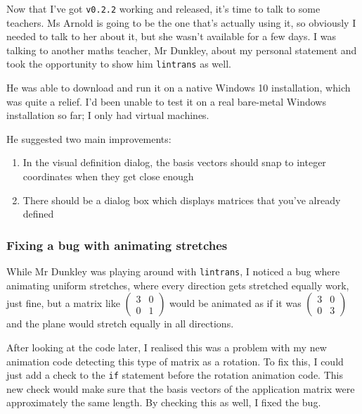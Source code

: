 \documentclass[../development.tex]{subfiles}
\begin{document}
Now that I've got \texttt{v0.2.2} working and released, it's time to talk to some teachers. Ms Arnold is going to be the one that's actually using it, so obviously I needed to talk to her about it, but she wasn't available for a few days. I was talking to another maths teacher, Mr Dunkley, about my personal statement and took the opportunity to show him \texttt{lintrans} as well.

He was able to download and run it on a native Windows 10 installation, which was quite a relief. I'd been unable to test it on a real bare-metal Windows installation so far; I only had virtual machines.

He suggested two main improvements: \begin{enumerate}
	\item In the visual definition dialog, the basis vectors should snap to integer coordinates when they get close enough
	\item There should be a dialog box which displays matrices that you've already defined
\end{enumerate}

\subsubsection{Fixing a bug with animating stretches\label{development:teacher-suggestions:fixing-a-bug-with-animating-stretches}}

While Mr Dunkley was playing around with \texttt{lintrans}, I noticed a bug where animating uniform stretches, where every direction gets stretched equally work, just fine, but a matrix like $\begin{pmatrix}3 & 0\\ 0 & 1\end{pmatrix}$ would be animated as if it was $\begin{pmatrix}3 & 0\\ 0 & 3\end{pmatrix}$ and the plane would stretch equally in all directions.

After looking at the code later, I realised this was a problem with my new animation code detecting this type of matrix as a rotation. To fix this, I could just add a check to the \texttt{if} statement before the rotation animation code. This new check would make sure that the basis vectors of the application matrix were approximately the same length. By checking this as well, I fixed the bug.

\end{document}
